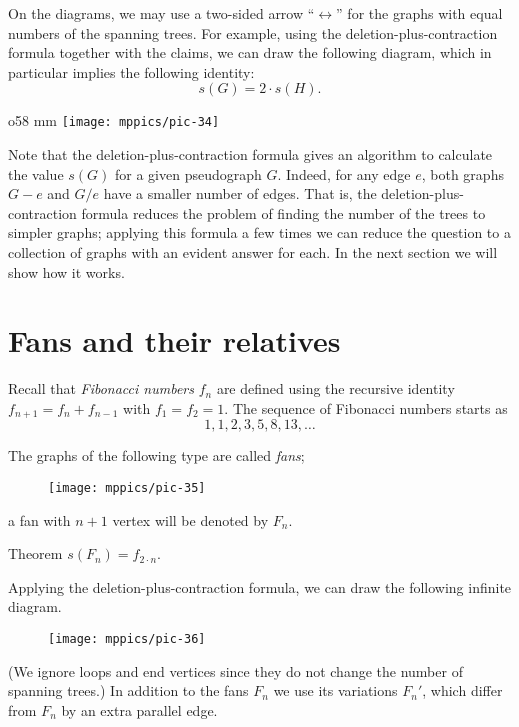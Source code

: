 On the diagrams, we may use a two-sided arrow ``$\leftrightarrow$'' for the graphs with equal numbers of the spanning trees.
For example, using the deletion-plus-contraction formula together with the claims, we can draw the following diagram, which in particular implies the following identity:
\[s(G)=2\cdot s(H).\]

\begin{wrapfigure}{o}{58 mm}
\vskip-0mm
\centering
\texttt{[image: mppics/pic-34]}
\vskip-0mm
\end{wrapfigure}

Note that the deletion-plus-contraction formula gives an algorithm to calculate  the value $s(G)$ for a given pseudograph $G$.
Indeed, for any edge $e$, both graphs $G- e$ and $G/e$ have a smaller number of edges.
That is, the deletion-plus-contraction formula reduces the problem of finding the number of the trees to simpler graphs;
applying this formula a few times we can reduce the question to a collection of graphs with an evident answer for each.
In the next section we will show how it works.


 
\section{Fans and their relatives}



Recall that \emph{Fibonacci numbers} $f_n$ are defined using the recursive identity 
$f_{n+1}=f_n+f_{n-1}$
with $f_1=f_2=1$.
The sequence of Fibonacci numbers starts as
\[1,1,2,3,5,8,13,\dots\]

The graphs of the following type are called \label{page:fan}\emph{fans}; 
\begin{figure}[ht!]
\centering
\texttt{[image: mppics/pic-35]}
\end{figure}
a fan with $n+1$ vertex will be denoted by $F_n$. 

\begin{thm}{Theorem}\label{thm:fans}
$s(F_n)=f_{2\cdot n}$.
\end{thm}

Applying the deletion-plus-contraction formula, we can draw the following infinite diagram.
\begin{figure}[ht!]
\centering
\texttt{[image: mppics/pic-36]}
\end{figure}
(We ignore loops and end vertices since they do not change the number of spanning trees.)
In addition to the fans $F_n$ we use its variations $F_n'$, which differ from $F_n$ by an extra parallel edge.

